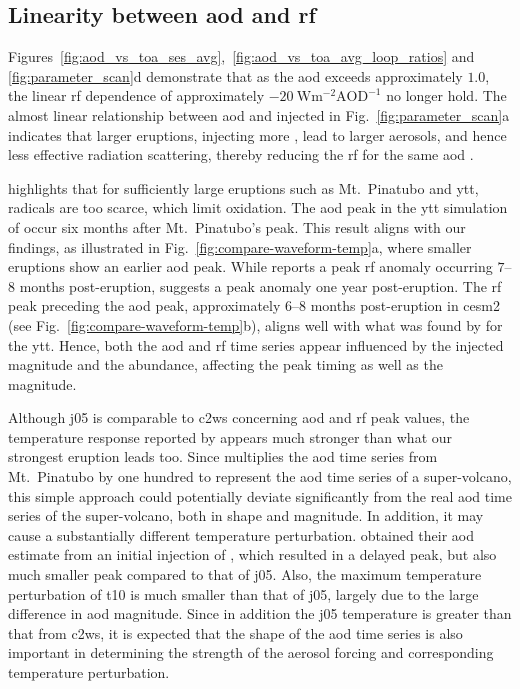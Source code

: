\documentclass{ametsocV6.1}
\newcommand{\iso}[1][i]{{#1}njected \ce{SO2}}
\begin{document}
\subsection{Linearity between \gls{aod} and \gls{rf}}

Figures~\ref{fig:aod_vs_toa_ses_avg},~\ref{fig:aod_vs_toa_avg_loop_ratios} and
\ref{fig:parameter_scan}d demonstrate that as the \gls{aod} exceeds approximately
\(1.0\), the linear \gls{rf} dependence of approximately
\(\SI{-20}{\watt\metre^{-2}\mathrm{AOD}^{-1}}\) no longer hold. The almost linear
relationship between \gls{aod} and \iso{} in Fig.~\ref{fig:parameter_scan}a indicates
that larger eruptions, injecting more , lead to larger aerosols, and hence less
effective radiation scattering, thereby reducing the \gls{rf} for the same \gls{aod}
\citep{english2013, timmreck2010, timmreck2018}.

\citet{timmreck2010} highlights that for sufficiently large eruptions such as Mt.\
Pinatubo and \gls{ytt},  radicals are too scarce, which limit  oxidation.
The \gls{aod} peak in the \gls{ytt} simulation of \citet{timmreck2010} occur six months
after Mt.\ Pinatubo's peak. This result aligns with our findings, as illustrated in
Fig.~\ref{fig:compare-waveform-temp}a, where smaller eruptions show an earlier \gls{aod}
peak. While \citet{timmreck2010} reports a peak \gls{rf} anomaly occurring \(7\)--\(8\)
months post-eruption, \citet{jones2005} suggests a peak anomaly one year post-eruption.
The \gls{rf} peak preceding the \gls{aod} peak, approximately \(6\)--\(8\) months
post-eruption in \gls{cesm2} (see Fig.~\ref{fig:compare-waveform-temp}b), aligns well
with what was found by \citet{timmreck2010} for the \gls{ytt}. Hence, both the \gls{aod}
and \gls{rf} time series appear influenced by the \iso{} magnitude and the \ce{OH}
abundance, affecting the peak timing as well as the magnitude.

Although \gls{j05} is comparable to \gls{c2ws} concerning \gls{aod} and \gls{rf} peak
values, the temperature response reported by \citet{jones2005} appears much stronger
than what our strongest eruption leads too. Since \citet{jones2005} multiplies the
\gls{aod} time series from Mt.\ Pinatubo by one hundred to represent the \gls{aod} time
series of a super-volcano, this simple approach could potentially deviate significantly
from the real \gls{aod} time series of the super-volcano, both in shape and magnitude.
In addition, it may cause a substantially different temperature perturbation.
\citet{timmreck2010} obtained their \gls{aod} estimate from an initial injection of
\ce{SO2}, which resulted in a delayed peak, but also much smaller peak compared to that
of \gls{j05}. Also, the maximum temperature perturbation of \gls{t10} is much smaller
than that of \gls{j05}, largely due to the large difference in \gls{aod} magnitude.
Since in addition the \gls{j05} temperature is greater than that from \gls{c2ws}, it is
expected that the shape of the \gls{aod} time series is also important in determining
the strength of the aerosol forcing and corresponding temperature perturbation.
\end{document}
